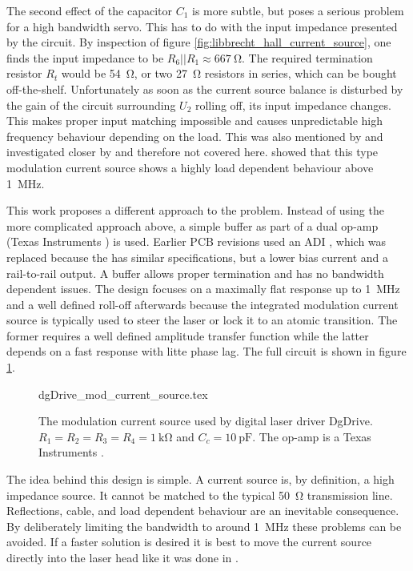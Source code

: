 The second effect of the capacitor $C_1$ is more subtle, but poses a serious problem for a high bandwidth servo. This has to do with the input impedance presented by the circuit. By inspection of figure \ref{fig:libbrecht_hall_current_source}, one finds the input impedance to be $R_6 || R_1 \approx \qty{667}{\ohm}$. The required termination resistor $R_t$ would be \qty{54}{\ohm}, or two \qty{27}{\ohm} resistors in series, which can be bought off-the-shelf. Unfortunately as soon as the current source balance is disturbed by the gain of the circuit surrounding $U_2$ rolling off, its input impedance changes. This makes proper input matching impossible and causes unpredictable high frequency behaviour depending on the load. This was also mentioned by \cite{laser_driver_digital} and investigated closer by \citeauthor{thesis_tilman} \cite{thesis_tilman} and therefore not covered here. \citeauthor{thesis_tilman} showed that this type modulation current source shows a highly load dependent behaviour above \qty{1}{\MHz}.

This work proposes a different approach to the problem. Instead of using the more complicated approach above, a simple buffer as part of a dual op-amp (Texas Instruments  \cite{datasheet_OPA2140}) is used. Earlier PCB revisions used an ADI  \cite{datasheet_AD8672}, which was replaced because the  has similar specifications, but a lower bias current and a rail-to-rail output. A buffer allows proper termination and has no bandwidth dependent issues. The design focuses on a maximally flat response up to \qty{1}{\MHz} and a well defined roll-off afterwards because the integrated modulation current source is typically used to steer the laser or lock it to an atomic transition. The former requires a well defined amplitude transfer function while the latter depends on a fast response with litte phase lag. The full circuit is shown in figure \ref{fig:dgDrive_mod_current_source}.
\begin{figure}[ht]
    \centering
        {dgDrive_mod_current_source.tex}
    \caption{The modulation current source used by digital laser driver DgDrive. $R_1=R_2=R_3=R_4 = \qty{1}{\kilo\ohm}$ and $C_c = \qty{10}{\pF}$. The op-amp is a Texas Instruments .}
    \label{fig:dgDrive_mod_current_source}
\end{figure}

The idea behind this design is simple. A current source is, by definition, a high impedance source. It cannot be matched to the typical \qty{50}{\ohm} transmission line. Reflections, cable, and load dependent behaviour are an inevitable consequence. By deliberately limiting the bandwidth to around \qty{1}{\MHz} these problems can be avoided. If a faster solution is desired it is best to move the current source directly into the laser head like it was done in \cite{current_mod_paper}.

